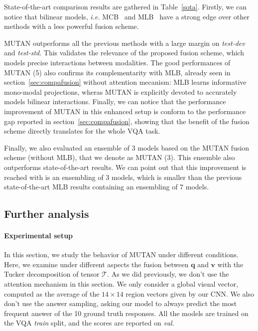 \documentclass[10pt,twocolumn,letterpaper]{article}
\newcommand{\tens}[1]{
\bm{\mathcal{#1}}
}
\newcommand{\q}{\mathbf{q}}
\newcommand{\vv}{\mathbf{v}}
\begin{document}
State-of-the-art comparison results are gathered in Table~\ref{sota}.
Firstly, we can notice that bilinear models, \textit{i.e.} MCB~\cite{fukui16mcb} and MLB~\cite{Kim2017} have a strong edge over other methods with a less powerful fusion scheme.

MUTAN outperforms all the previous methods with a large margin on \textit{test-dev} and \textit{test-std}.
This validates the relevance of the proposed fusion scheme, which models precise interactions between modalities. 
The good performances of MUTAN (5) also confirms its complementarity with MLB, already seen in section~\ref{sec:compafusion} without attention mecanism: 
MLB learns informative mono-modal projections, wheras MUTAN is explicitly devoted to accurately models bilinear interactions. 
Finally, we can notice that the performance improvement of MUTAN in this enhanced setup is conform to the performance gap reported in section~\ref{sec:compafusion}, 
showing that the benefit of the fusion scheme directly translates for the whole VQA task. 

Finally, we also evaluated an ensemble of 3 models based on the MUTAN fusion scheme (without MLB), that we denote as MUTAN (3). This ensemble also outperforms state-of-the-art results. We can point out that this improvement is reached with is an ensembling of 3 models, 
which is smaller than the previous state-of-the-art MLB results containing an ensembling of 7 models. 


 \subsection{Further analysis}

\paragraph{Experimental setup}
In this section, we study the behavior of MUTAN under different conditions. Here, we examine under different aspects the fusion between $\q$ and $\vv$ with the Tucker decomposition of tensor $\tens{T}$. As we did previously, we don't use the attention mechanism in this section. We only consider a global visual vector, computed as the average of the $14 \times 14$ region vectors given by our CNN. We also don't use the answer sampling, asking our model to always predict the most frequent answer of the 10 ground truth responses. All the models are trained on the VQA \textit{train} split, and the scores are reported on \textit{val}.
\vspace{-0.3cm}
\end{document}
